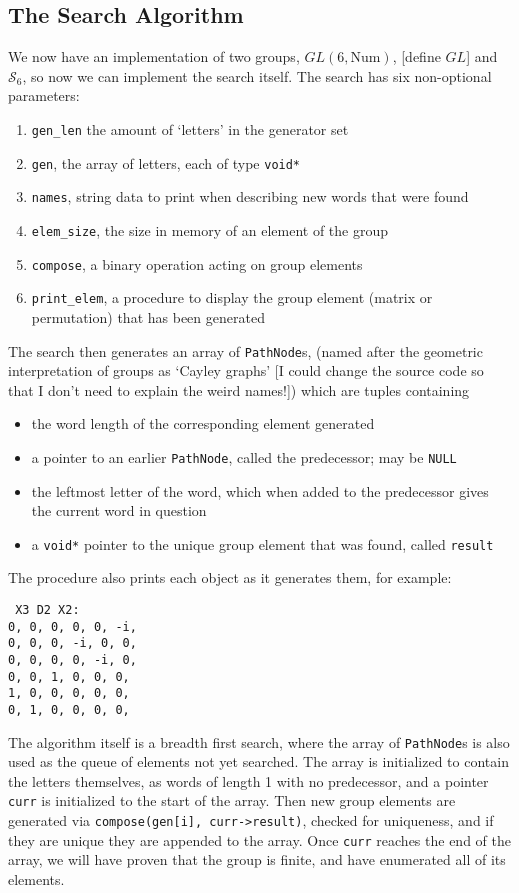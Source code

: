 \subsection{The Search Algorithm}
We now have an implementation of two groups, $GL(6, \text{Num})$, [define $GL$] and $\mathcal{S}_6$, so now we can implement the search itself. The search has six non-optional parameters:
\begin{enumerate}
	\item \verb`gen_len` the amount of `letters' in the generator set
	\item \verb`gen`, the array of letters, each of type \verb`void*`
	\item \verb`names`, string data to print when describing new words that were found
	\item \verb`elem_size`, the size in memory of an element of the group
	\item \verb`compose`, a binary operation acting on group elements
	\item \verb`print_elem`, a procedure to display the group element (matrix or permutation) that has been generated
\end{enumerate}
The search then generates an array of \verb`PathNode`s, (named after the geometric interpretation of groups as `Cayley graphs' [I could change the source code so that I don't need to explain the weird names!]) which are tuples containing
\begin{itemize}
	\item the word length of the corresponding element generated
	\item a pointer to an earlier \verb`PathNode`, called the predecessor; may be \verb`NULL`
	\item the leftmost letter of the word, which when added to the predecessor gives the current word in question
	\item a \verb`void*` pointer to the unique group element that was found, called \verb`result`
\end{itemize}
The procedure also prints each object as it generates them, for example:
\begin{verbatim}
 X3 D2 X2:
0, 0, 0, 0, 0, -i, 
0, 0, 0, -i, 0, 0, 
0, 0, 0, 0, -i, 0, 
0, 0, 1, 0, 0, 0, 
1, 0, 0, 0, 0, 0, 
0, 1, 0, 0, 0, 0, 
\end{verbatim}

The algorithm itself is a breadth first search, where the array of \verb`PathNode`s is also used as the queue of elements not yet searched. The array is initialized to contain the letters themselves, as words of length 1 with no predecessor, and a pointer \verb`curr` is initialized to the start of the array. Then new group elements are generated via \verb`compose(gen[i], curr->result)`, checked for uniqueness, and if they are unique they are appended to the array. Once \verb`curr` reaches the end of the array, we will have proven that the group is finite, and have enumerated all of its elements.

